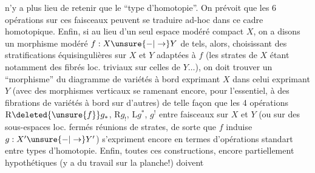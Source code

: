 n'y a plus lieu de retenir que le ``type d'homotopie''. On prévoit que les 6 opérations sur ces faisceaux peuvent se traduire ad-hoc dans ce cadre homotopique. Enfin, si au lieu d'un seul espace modéré compact $X$, on a disons un morphisme modéré $f:X\unsure{-|\to}Y$ de tels, alors, choisissant des stratifications équisingulières sur $X$ et $Y$ adaptées à $f$ (les strates de $X$ étant notamment des fibrés loc. triviaux sur celles de $Y\ldots$), on doit trouver un ``morphisme'' du diagramme de variétés à bord exprimant $X$ dans celui exprimant $Y$ (avec des morphismes verticaux se ramenant  encore, pour l'essentiel, à des fibrations de variétés à bord sur d'autres) de telle façon que les 4 opérations $\mathrm{R}\deleted{\unsure{f}}g_*$, $\mathrm{R}g_!$, $\mathrm{L}g^*$, $g^!$ entre faisceaux  sur $X$ et $Y$ (ou sur des sous-espaces loc. fermés  réunions de strates, de sorte que $f$ induise $g:X'\unsure{-|\to}Y'$) s'expriment encore en termes d'opérations standart entre  types d'homotopie. Enfin, toutes ces constructions, encore partiellement hypothétiques (y a du travail  sur la planche!) doivent
